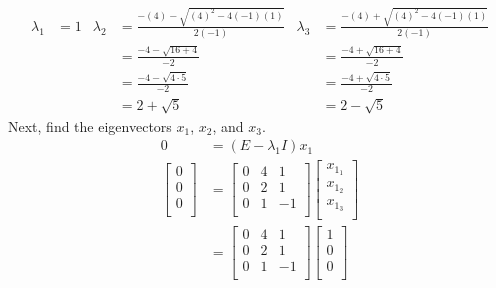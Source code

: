 \documentclass[titlepage]{article}
\begin{document}
\begin{align*}
    \lambda_1 &= 1&
        \lambda_2 &= \frac{-(4)-\sqrt{(4)^2-4(-1)(1)}}{2(-1)}&
            \lambda_3 &= \frac{-(4)+\sqrt{(4)^2-4(-1)(1)}}{2(-1)}\\
    &&
        &= \frac{-4-\sqrt{16+4}}{-2}&
            &= \frac{-4+\sqrt{16+4}}{-2}\\
    &&
        &= \frac{-4-\sqrt{4\cdot 5}}{-2}&
            &= \frac{-4+\sqrt{4\cdot 5}}{-2}\\
    &&
        &= 2+\sqrt{5}&
            &= 2-\sqrt{5}
\end{align*}
Next, find the eigenvectors $x_1$, $x_2$, and $x_3$.
\begin{align*}
    0 &= (E-\lambda_1I)x_1\\
    \begin{bmatrix}
        0\\
        0\\
        0\\
    \end{bmatrix}
    &=
    \begin{bmatrix}
        0 & 4 & 1\\
        0 & 2 & 1\\
        0 & 1 & -1\\
    \end{bmatrix}
    \begin{bmatrix}
        x_{1_1}\\
        x_{1_2}\\
        x_{1_3}\\
    \end{bmatrix}\\
    &=
    \begin{bmatrix}
        0 & 4 & 1\\
        0 & 2 & 1\\
        0 & 1 & -1\\
    \end{bmatrix}
    \begin{bmatrix}
        1\\
        0\\
        0\\
    \end{bmatrix}
\end{align*}
\end{document}

